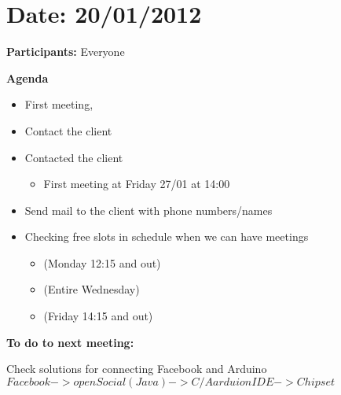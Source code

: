 
\section{Date: 20/01/2012}

\textbf{Participants:} Everyone

\textbf{Agenda}

\begin{itemize}
	\item First meeting, 
	\item Contact the client
	\item Contacted the client
	\begin{itemize}\item First meeting at Friday 27/01 at 14:00 \end{itemize}


	\item Send mail to the client with phone numbers/names

	\item Checking free slots in schedule when we can have meetings
	\begin{itemize}
		\item (Monday 12:15 and out)
		\item (Entire Wednesday)
		\item (Friday 14:15 and out)
	\end{itemize}
\end{itemize}

\textbf{To do to next meeting:}

Check solutions for connecting Facebook and Arduino\newline
$Facebook -> openSocial (Java) -> C/Aarduion IDE -> Chipset$

